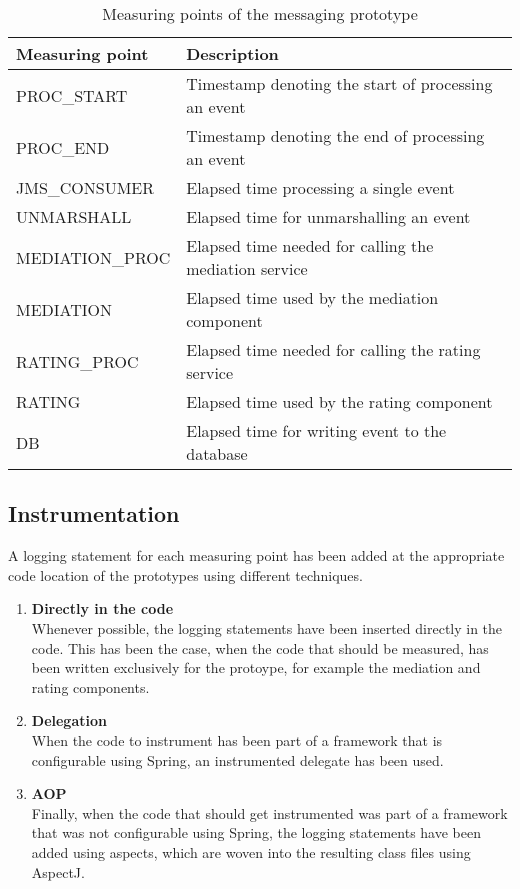 \begin{table}[htpb]
	\renewcommand{\arraystretch}{1.5}
	\caption{Measuring points of the messaging prototype}
	\label{table:ch4_measuring_points_messaging}
	\centering
	\begin{tabular}{|l|p{4.5cm}|}
		\hline
		\bfseries Measuring point & \bfseries Description\\
		\hline
		PROC\_START & Timestamp denoting the start of processing an event\\
		\hline
		PROC\_END & Timestamp denoting the end of processing an event\\
		\hline
		JMS\_CONSUMER & Elapsed time processing a single event\\
		\hline
		UNMARSHALL & Elapsed time for unmarshalling an event\\
		\hline
		MEDIATION\_PROC & Elapsed time needed for calling the mediation service\\
		\hline
		MEDIATION & Elapsed time used by the mediation component\\
		\hline
		RATING\_PROC & Elapsed time needed for calling the rating service\\
		\hline
		RATING & Elapsed time used by the rating component\\
		\hline
		DB & Elapsed time for writing event to the database\\
		\hline 
	\end{tabular}
\end{table}

\subsection{Instrumentation}
A logging statement for each measuring point has been added at the appropriate code location of the prototypes using different techniques.

\begin{enumerate}
	\item \textbf{Directly in the code}\\Whenever possible, the logging statements have been inserted directly in the code. This has been the case, when the code that should be measured, has been written exclusively for the protoype, for example the mediation and rating components.
	\item \textbf{Delegation}\\When the code to instrument has been part of a framework that is configurable using Spring, an instrumented delegate has been used.
	\item \textbf{AOP}\\Finally, when the code that should get instrumented was part of a framework that was not configurable using Spring, the logging statements have been added using aspects, which are woven into the resulting class files using AspectJ.
\end{enumerate}

